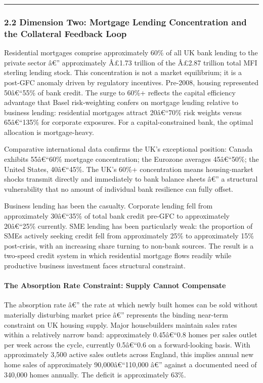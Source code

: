 \begin{center}\rule{0.5\linewidth}{0.5pt}\end{center}

\subsubsection{2.2 Dimension Two: Mortgage Lending Concentration and the
Collateral Feedback
Loop}\label{dimension-two-mortgage-lending-concentration-and-the-collateral-feedback-loop}

Residential mortgages comprise approximately 60\% of all UK bank lending
to the private sector â€'' approximately Â£1.73 trillion of the Â£2.87
trillion total MFI sterling lending stock. This concentration is not a
market equilibrium; it is a post-GFC anomaly driven by regulatory
incentives. Pre-2008, housing represented 50â€``55\% of bank credit. The
surge to 60\%+ reflects the capital efficiency advantage that Basel
risk-weighting confers on mortgage lending relative to business lending:
residential mortgages attract 20â€``70\% risk weights versus 65â€``135\%
for corporate exposures. For a capital-constrained bank, the optimal
allocation is mortgage-heavy.

Comparative international data confirms the UK's exceptional position:
Canada exhibits 55â€``60\% mortgage concentration; the Eurozone averages
45â€``50\%; the United States, 40â€``45\%. The UK's 60\%+ concentration
means housing-market shocks transmit directly and immediately to bank
balance sheets â€'' a structural vulnerability that no amount of
individual bank resilience can fully offset.

Business lending has been the casualty. Corporate lending fell from
approximately 30â€``35\% of total bank credit pre-GFC to approximately
20â€``25\% currently. SME lending has been particularly weak: the
proportion of SMEs actively seeking credit fell from approximately 25\%
to approximately 15\% post-crisis, with an increasing share turning to
non-bank sources. The result is a two-speed credit system in which
residential mortgage flows readily while productive business investment
faces structural constraint.

\paragraph{The Absorption Rate Constraint: Supply Cannot
Compensate}\label{the-absorption-rate-constraint-supply-cannot-compensate}

The absorption rate â€'' the rate at which newly built homes can be sold
without materially disturbing market price â€'' represents the binding
near-term constraint on UK housing supply. Major housebuilders maintain
sales rates within a relatively narrow band: approximately 0.45â€``0.8
homes per sales outlet per week across the cycle, currently 0.5â€``0.6
on a forward-looking basis. With approximately 3,500 active sales
outlets across England, this implies annual new home sales of
approximately 90,000â€``110,000 â€'' against a documented need of
340,000 homes annually. The deficit is approximately 63\%.

